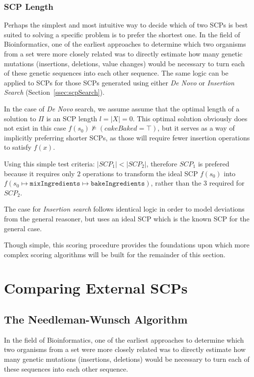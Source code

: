 \subsubsection{SCP Length}
Perhaps the simplest and most intuitive way to decide which of two SCPs is best suited to solving a specific problem is to prefer the shortest one. In the field of Bioinformatics, one of the earliest approaches to determine which two organisms from a set were more closely related was to directly estimate how many genetic mutations (insertions, deletions, value changes) would be necessary to turn each of these genetic sequences into each other sequence. The same logic can be applied to SCPs for those SCPs generated using either \textit{De Novo} or \textit{Insertion Search} (Section~\ref{ssec:scpSearch}).

In the case of \textit{De Novo} search, we assume assume that the optimal length of a solution to $\Pi$ is an SCP length $l=|X|=0$. This optimal solution obviously does not exist in this case $f(s_0) \not\models (cakeBaked = \top)$, but it serves as a way of implicitly preferring shorter SCPs, as those will require fewer insertion operations to satisfy $f(x)$. 

Using this simple test criteria: $|SCP_1| < |SCP_2|$, therefore $SCP_1$ is prefered because it requires only $2$ operations to transform the ideal SCP $f(s_0)$ into $f(s_0\longmapsto \texttt{mixIngredients} \longmapsto \texttt{bakeIngredients})$, rather than the $3$ required for $SCP_2$.

The case for \textit{Insertion search} follows identical logic in order to model deviations from the general reasoner, but uses an ideal SCP which is the known SCP for the general case.

Though simple, this scoring procedure provides the foundations upon which more complex scoring algorithms will be built for the remainder of this section.

\section{Comparing External SCPs} \label{ssec:compExt}
\subsection{The Needleman-Wunsch Algorithm} \label{ssec:nw}
In the field of Bioinformatics, one of the earliest approaches to determine which two organisms from a set were more closely related was to directly estimate how many genetic mutations (insertions, deletions) would be necessary to turn each of these sequences into each other sequence.

